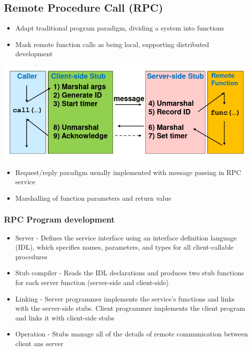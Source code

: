 \documentclass{article}[18pt]
\begin{document}
\subsection{Remote Procedure Call (RPC)}
\begin{itemize}
	\item Adapt traditional program paradigm, dividing a system into functions
	\item Mask remote function calls as being local, supporting distributed development
\end{itemize}
\begin{center}
	\includegraphics[scale=0.7]{RPC}
\end{center}
\begin{itemize}
	\item Request/reply paradigm usually implemented with message passing in RPC service
	\item Marshalling of function parameters and return value
\end{itemize}
\subsubsection{RPC Program development}
\begin{itemize}
	\item Server - Defines the service interface using an interface definition language (IDL), which specifies names, parameters, and types for all client-callable procedures
	\item Stub compiler - Reads the IDL declarations and produces two stub functions for each server function (server-side and client-side)
	\item Linking - Server programmer implements the service's functions and links with the server-side stubs. Client programmer implements the client program and links it with client-side stubs
	\item Operation  - Stubs manage all of the details of remote communication between client ans server
\end{itemize}
\end{document}
